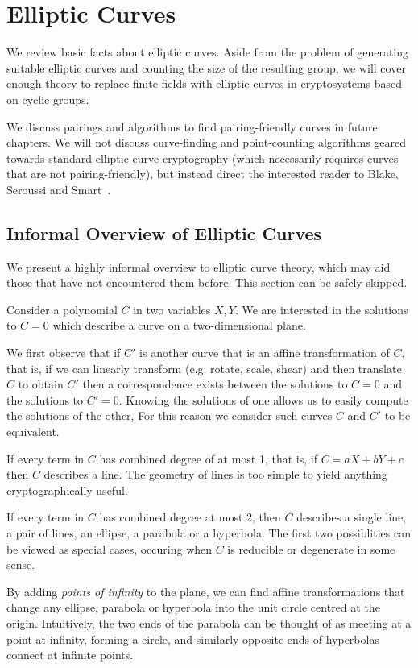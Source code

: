 \chapter {Elliptic Curves}

We review basic facts about elliptic curves.
Aside from the problem of generating suitable elliptic curves
and counting the size of the resulting group,
we will cover enough theory to replace finite fields with
elliptic curves in cryptosystems based on cyclic groups.

We discuss pairings and algorithms to find pairing-friendly curves
in future chapters. We will not
discuss curve-finding and point-counting algorithms geared
towards standard elliptic curve cryptography (which necessarily requires
curves that are not pairing-friendly), but instead direct
the interested reader to Blake, Seroussi and Smart~\cite{bss}.

\section {Informal Overview of Elliptic Curves}

We present a highly informal overview to elliptic curve theory,
which may aid those that have not encountered them before.
This section can be safely skipped.

Consider a polynomial $C$ in two variables $X, Y$.
We are interested in the solutions to $C = 0$
which describe a curve on a two-dimensional plane.

We first observe that if $C'$ is another curve that is an affine transformation
of $C$, that is, if we can linearly transform (e.g. rotate, scale, shear)
and then translate $C$ to
obtain $C'$ then a correspondence exists between
the solutions to $C = 0$ and the solutions to $C' = 0$. Knowing
the solutions of one allows us to easily compute the solutions of the other,
For this reason we consider such curves $C$ and $C'$ to be equivalent.

If every term in $C$ has combined degree of at most 1, that is,
if $C = a X + b Y + c$ then $C$ describes a line. The geometry of lines
is too simple to yield anything cryptographically useful.

If every term in $C$ has combined degree at most 2, then $C$ describes
a single line, a pair of lines, an ellipse, a parabola or a hyperbola.
The first two possiblities can be viewed as special cases, occuring
when $C$ is reducible or degenerate in some sense.

By adding \emph{points of infinity} to the plane, we can find affine
transformations that change any ellipse, parabola or hyperbola into the
unit circle centred at the origin. Intuitively, the two ends of the parabola
can be thought of as meeting
at a point at infinity, forming a circle,
and similarly opposite ends of hyperbolas connect at infinite points.

